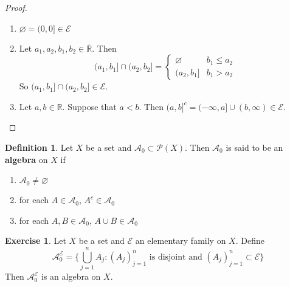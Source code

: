 \documentclass{book}
\theoremstyle{definition}
\newtheorem{defn}[definition]{Definition}
\newtheorem{ex}[definition]{Exercise}
\newcommand{\R}{\mathbb{R}}
\newcommand{\MA}{\mathcal{A}}
\newcommand{\ME}{\mathcal{E}}
\newcommand{\MP}{\mathcal{P}}
\newcommand{\lex}[1]{\label{ex:#1}}
\newcommand{\ld}[1]{\label{defn:#1}}
\DeclareMathOperator*{\0}{\mbf{0}}
\DeclareMathOperator*{\1}{\mbf{1}}
\begin{document}
	\begin{proof}\
		\begin{enumerate}
			\item $\varnothing = (0,0] \in \ME$
			\item Let $a_1, a_2, b_1, b_2 \in \overline{\R}$. Then 
			\[
			(a_1, b_1] \cap  (a_2, b_2] =
			\begin{cases}
				\varnothing  & b_1 \leq a_2 \\
				(a_2, b_1] & b_1 > a_2 
			\end{cases} 
			\]
			So $(a_1, b_1] \cap  (a_2, b_2] \in \ME$.
			\item Let $a, b \in \R$. Suppose that $a < b$. Then $(a,b]^c = (-\infty, a] \cup (b, \infty) \in \ME$. 
		\end{enumerate}
	\end{proof}
	
	\begin{defn} \ld{00000} 
		Let $X$ be a set and $\MA_0 \subset \MP(X)$. Then $\MA_0$ is said to be an \textbf{algebra} on $X$ if 
		\begin{enumerate}
			\item $\MA_0 \neq \varnothing$
			\item for each $A \in \MA_0$, $A^c \in \MA_0$
			\item for each $A,B \in \MA_0$, $A \cup B \in \MA_0$
		\end{enumerate}
	\end{defn}
	
	\begin{ex} \lex{00000} 
		Let $X$ be a set and $\ME$ an elementary family on $X$. Define $$\MA^{\ME}_0 = \bigg \{ \bigcup_{j=1}^n A_j: (A_j)_{j=1}^n \text{ is disjoint and } (A_j)_{j=1}^n \subset \ME \bigg \}$$ Then $\MA^{\ME}_0$ is an algebra on $X$.
	\end{ex}	
	
\end{document}
